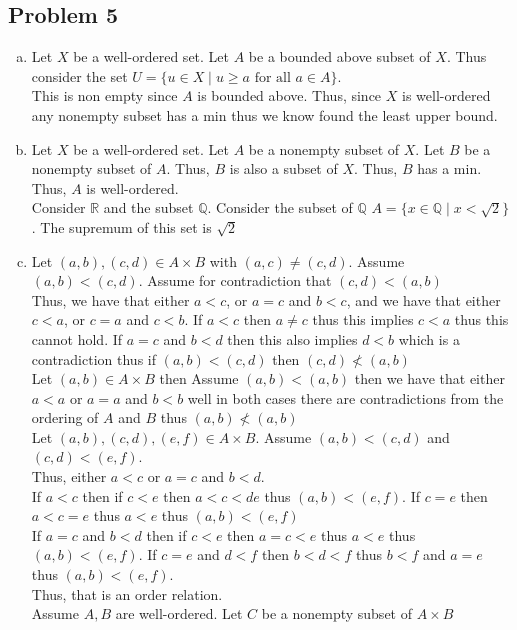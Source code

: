 \documentclass[12pt, letterpaper]{article}
\theoremstyle{definition}
\newcommand{\R}{\mathbb{R}}
\newcommand{\Q}{\mathbb{Q}}
\renewcommand{\t}[1]{\text{#1}}
\begin{document}
\subsection*{Problem 5}
\begin{enumerate}[(a)]
    \item Let $X$ be a well-ordered set. Let $A$ be a bounded above subset of $X$. Thus consider the set $U=\{u \in X \mid u \geq a \t{ for all } a \in A\}$.\\
    This is non empty since $A$ is bounded above. Thus, since $X$ is well-ordered any nonempty subset has a min thus we know found the least upper bound.
    \item Let $X$ be a well-ordered set. Let $A$ be a nonempty subset of $X$. Let $B$ be a nonempty subset of $A$. Thus, $B$ is also a subset of $X$. Thus, $B$ has a min. Thus, $A$ is well-ordered.\\
    Consider $\R$ and the subset $\Q$. Consider the subset of $\Q$ $A=\{x \in \Q \mid x < \sqrt{2}\}$. The supremum of this set is $\sqrt{2}$
    \item Let $(a,b),(c,d) \in A \times B$ with $(a,c) \neq (c,d)$. Assume $(a,b) < (c,d)$. Assume for contradiction that $(c,d)<(a,b)$\\
    Thus, we have that either $a<c$, or $a=c$ and $b<c$, and we have that either $c<a$, or $c=a$ and $c<b$. If $a<c$ then $a \neq c$ thus this implies $c<a$ thus this cannot hold. If $a=c$ and $b<d$ then this also implies $d<b$ which is a contradiction thus if $(a,b)<(c,d)$ then $(c,d)\nless(a,b)$\\
    Let $(a,b) \in A \times B$ then Assume $(a,b) < (a,b)$ then we have that either $a<a$ or $a=a$ and $b<b$ well in both cases there are contradictions from the ordering of $A$ and $B$ thus $(a,b) \nless (a,b)$\\
    Let $(a,b),(c,d),(e,f) \in A \times B$. Assume $(a,b) < (c,d)$ and $(c,d) < (e,f)$.\\
    Thus, either $a<c$ or $a=c$ and $b<d$.\\
    If $a<c$ then if $c<e$ then $a<c<de$ thus $(a,b)<(e,f)$. If $c=e$ then $a<c=e$ thus $a<e$ thus $(a,b)<(e,f)$\\
    If $a=c$ and $b<d$ then if $c<e$ then $a=c<e$ thus $a<e$ thus $(a,b)<(e,f)$. If $c=e$ and $d<f$ then $b<d<f$ thus $b<f$ and $a=e$ thus $(a,b)<(e,f)$.\\
    Thus, that is an order relation.\\
    Assume $A,B$ are well-ordered. Let $C$ be a nonempty subset of $A \times B$\\

\end{enumerate}
\end{document}
